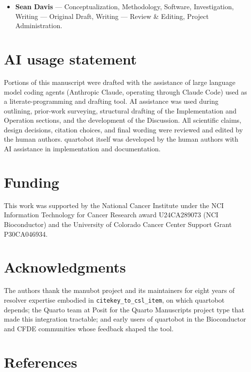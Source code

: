 \documentclass[
  letterpaper,
  DIV=11,
  numbers=noendperiod]{scrartcl}
\providecommand{\tightlist}{%
  \setlength{\itemsep}{0pt}\setlength{\parskip}{0pt}}
\begin{document}
\begin{itemize}
\tightlist
\item
  \textbf{Sean Davis} --- Conceptualization, Methodology, Software,
  Investigation, Writing --- Original Draft, Writing --- Review \&
  Editing, Project Administration.
\end{itemize}

\section{AI usage statement}\label{ai-usage-statement}

Portions of this manuscript were drafted with the assistance of large
language model coding agents (Anthropic Claude, operating through Claude
Code) used as a literate-programming and drafting tool. AI assistance
was used during outlining, prior-work surveying, structural drafting of
the Implementation and Operation sections, and the development of the
Discussion. All scientific claims, design decisions, citation choices,
and final wording were reviewed and edited by the human authors.
quartobot itself was developed by the human authors with AI assistance
in implementation and documentation.

\section{Funding}\label{funding}

This work was supported by the National Cancer Institute under the NCI
Information Technology for Cancer Research award U24CA289073 (NCI
Bioconductor) and the University of Colorado Cancer Center Support Grant
P30CA046934.

\section{Acknowledgments}\label{acknowledgments}

The authors thank the manubot project and its maintainers for eight
years of resolver expertise embodied in \texttt{citekey\_to\_csl\_item},
on which quartobot depends; the Quarto team at Posit for the Quarto
Manuscripts project type that made this integration tractable; and early
users of quartobot in the Bioconductor and CFDE communities whose
feedback shaped the tool.

\section{References}\label{references}
\end{document}
